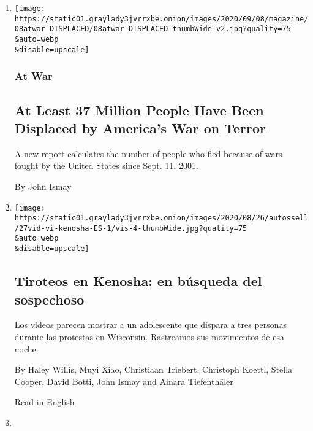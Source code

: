 \begin{enumerate}
\def\labelenumi{\arabic{enumi}.}
\item
  \href{/2020/09/08/magazine/displaced-war-on-terror.html}{}

  \texttt{[image: https://static01.graylady3jvrrxbe.onion/images/2020/09/08/magazine/08atwar-DISPLACED/08atwar-DISPLACED-thumbWide-v2.jpg?quality=75\\\&auto=webp\\\&disable=upscale]}

  \hypertarget{at-war}{%
  \subsubsection{At War}\label{at-war}}

  \hypertarget{at-least-37-million-people-have-been-displaced-by-americas-war-on-terror}{%
  \subsection{At Least 37 Million People Have Been Displaced by
  America's War on
  Terror}\label{at-least-37-million-people-have-been-displaced-by-americas-war-on-terror}}

  A new report calculates the number of people who fled because of wars
  fought by the United States since Sept. 11, 2001.

  By John Ismay
\item
  \href{/es/2020/08/27/espanol/estados-unidos/kyle-rittenhouse-kenosha-wisconsin.html}{}

  \texttt{[image: https://static01.graylady3jvrrxbe.onion/images/2020/08/26/autossell/27vid-vi-kenosha-ES-1/vis-4-thumbWide.jpg?quality=75\\\&auto=webp\\\&disable=upscale]}

  \hypertarget{tiroteos-en-kenosha-en-buxfasqueda-del-sospechoso}{%
  \subsection{Tiroteos en Kenosha: en búsqueda del
  sospechoso}\label{tiroteos-en-kenosha-en-buxfasqueda-del-sospechoso}}

  Los videos parecen mostrar a un adolescente que dispara a tres
  personas durante las protestas en Wisconsin. Rastreamos sus
  movimientos de esa noche.

  By Haley Willis, Muyi Xiao, Christiaan Triebert, Christoph Koettl,
  Stella Cooper, David Botti, John Ismay and Ainara Tiefenthäler

  \href{https://www.nytimes3xbfgragh.onion/2020/08/27/us/kyle-rittenhouse-kenosha-shooting-video.html}{Read
  in English}
\item
  \href{/2020/08/27/us/kyle-rittenhouse-kenosha-shooting-video.html}{}


\end{enumerate}

